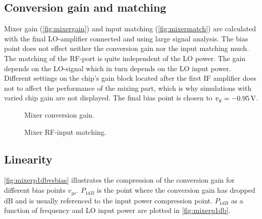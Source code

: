		\subsection{Conversion gain and matching}
			Mixer gain (\autoref{fig:mixergain}) and input matching (\autoref{fig:mixermatch}) are calculated with the final LO-amplifier connected and using large signal analysis. The bias point does not effect neither the conversion gain nor the input matching much. The matching of the RF-port is quite independent of the LO power. The gain depends on the LO-signal which in turn depends on the LO input power. Different settings on the chip's gain block located after the first IF amplifier does not to affect the performance of the mixing part, which is why simulations with varied chip gain are not displayed. The final bias point is chosen to $v_g=\unit[-0.95]{V}$.

			\begin{figure}[hpt!]
				\centering
				\caption[Mixer conversion gain.]{Mixer conversion gain.}\label{fig:mixergain}
			\end{figure}

			\begin{figure}[hpt!]
				\centering
				\caption[Mixer RF-input matching.]{Mixer RF-input matching.}\label{fig:mixermatch}
			\end{figure}

		\subsection{Linearity}
			\autoref{fig:mixerp1dbvsbias} illustrates the compression of the conversion gain for different bias points $v_{gs}$. $P_{1dB}$ is the point where the conversion gain has dropped \unit[1]{dB} and is usually referenced to the input power compression point. $P_{1dB}$ as a function of frequency and LO input power are plotted in \autoref{fig:mixerp1db}.

